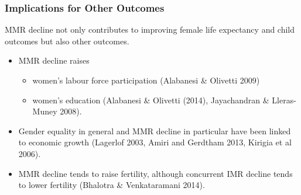 \documentclass[10pt,letterpaper,subeqn]{beamer}
\begin{document}
\begin{frame}
\frametitle{Implications for Other Outcomes}
MMR decline not only contributes to improving female life expectancy and child outcomes but also other outcomes.
\vspace{3mm}
\begin{itemize}
\setlength{\itemsep}{20pt}
	\item MMR decline raises
		\vspace{1.5mm}
		\begin{itemize}
		\setlength{\itemsep}{12pt}
			\item women's labour force participation (Alabanesi \& Olivetti 2009) 
			\item women's education (Alabanesi \& Olivetti (2014), Jayachandran \& Lleras-Muney 2008).
		\end{itemize}
		\item Gender equality in general and MMR decline in particular have been linked to economic growth (Lagerlof 2003, Amiri and Gerdtham 2013, Kirigia et al 2006).
		\item MMR decline tends to raise fertility, although concurrent IMR decline tends to lower fertility (Bhalotra \& Venkataramani 2014).
\end{itemize}
\end{frame}


\end{document}
